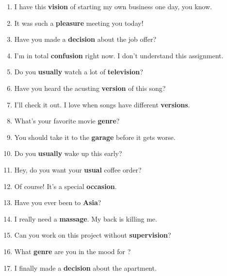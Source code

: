 \begin{enumerate}
  \item I have this \textbf{vi\textcolor{fancyorange}{si}on} of starting my own business one day, you know.
  \item It was such a \textbf{plea\textcolor{fancyorange}{su}re} meeting you today!
  \item Have you made a \textbf{deci\textcolor{fancyorange}{si}on} about the job offer?
  \item I'm in total \textbf{confu\textcolor{fancyorange}{si}on} right now. I don't understand this assignment.
  \item Do you \textbf{u\textcolor{fancyorange}{su}ally} watch a lot of \textbf{televi\textcolor{fancyorange}{si}on}?
  \item Have you heard the acusting \textbf{ver\textcolor{fancyorange}{si}on} of this song?
  \item I'll check it out. I love when songs have different \textbf{ver\textcolor{fancyorange}{si}ons}.
  \item What's your favorite movie \textbf{gen\textcolor{fancyorange}{re}}?
  \item You should take it to the \textbf{gara\textcolor{fancyorange}{ge}} before it gets worse.
  \item Do you \textbf{u\textcolor{fancyorange}{su}ally} wake up this early?
  \item Hey, do you want your \textbf{u\textcolor{fancyorange}{su}al} coffee order?
  \item Of course! It's a special \textbf{occa\textcolor{fancyorange}{si}on}.
  \item Have you ever been to \textbf{A\textcolor{fancyorange}{si}a}?
  \item I really need a \textbf{massa\textcolor{fancyorange}{ge}}. My back is killing me.
  \item Can you work on this project without \textbf{supervi\textcolor{fancyorange}{si}on}?
  \item What \textbf{gen\textcolor{fancyorange}{re}} are you in the mood for ?
  \item I finally made a \textbf{deci\textcolor{fancyorange}{si}on} about the apartment. 
\end{enumerate}

\newpage






